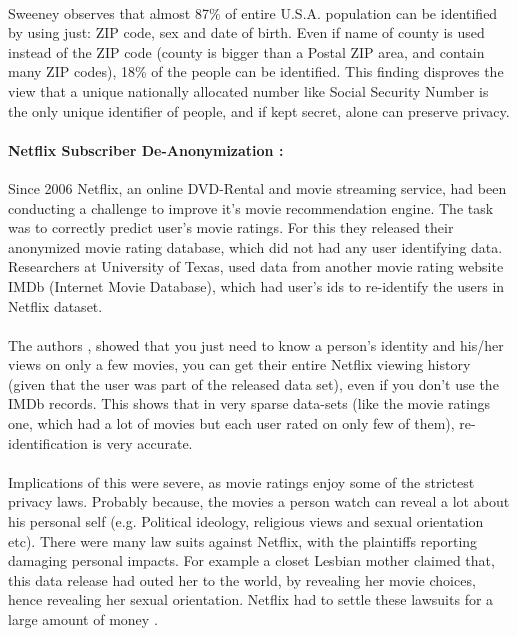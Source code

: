 \documentclass[12pt]{report}
\theoremstyle{named}
\begin{document}
\paragraph{}
Sweeney observes that almost 87\% of entire U.S.A. population can be identified by using just: ZIP code, sex and date of birth. Even if name of county is used instead of the ZIP code (county is bigger than a Postal ZIP area, and contain many ZIP codes), 18\% of the people can be identified. This finding disproves the view that a unique nationally allocated number like Social Security Number is the only unique identifier of people, and if kept secret, alone can preserve privacy.


\paragraph{Netflix Subscriber De-Anonymization \cite{narayanan2008robust}:\\}
Since 2006 Netflix, an online DVD-Rental and movie streaming service, had been conducting a challenge to improve it's movie recommendation engine. The task was to correctly predict user's movie ratings. For this they released their anonymized movie rating database, which did not had any user identifying data. Researchers at University of Texas, used data from another movie rating website IMDb (Internet Movie Database), which had user's ids to re-identify the users in Netflix dataset.
\paragraph{}
The authors \cite{narayanan2008robust}, showed that you just need to know a person's identity and his/her views on only a few movies, you can get their entire Netflix viewing history (given that the user was part of the released data set), even if you don't use the IMDb records. This shows that in very sparse data-sets (like the movie ratings one, which had a lot of movies but each user rated on only few of them), re-identification is very accurate.

\paragraph{}
Implications of this were severe, as movie ratings enjoy some of the strictest privacy laws. Probably because, the movies a person watch can reveal a lot about his personal self (e.g. Political ideology, religious views and sexual orientation etc). There were many law suits against Netflix, with the plaintiffs reporting damaging personal impacts. For example a closet Lesbian mother claimed that, this data release had outed her to the world, by revealing her movie choices, hence revealing her sexual orientation. Netflix had to settle these lawsuits for a large amount of money \cite{netFlixSetlement}.
\end{document}

